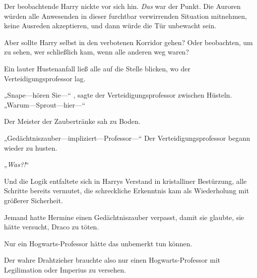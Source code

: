 Der beobachtende Harry nickte vor sich hin. \emph{Das} war der Punkt. Die Auroren würden alle Anwesenden in dieser furchtbar verwirrenden Situation mitnehmen, keine Ausreden akzeptieren, und dann würde die Tür unbewacht sein.

Aber sollte Harry selbst in den verbotenen Korridor gehen? Oder beobachten, um zu sehen, wer schließlich kam, wenn alle anderen weg waren?

Ein lauter Hustenanfall ließ alle auf die Stelle blicken, wo der Verteidigungsprofessor lag.

„Snape—hören Sie—“ , sagte der Verteidigungsprofessor zwischen Hüsteln. „Warum—Sprout—hier—“

Der Meister der Zaubertränke sah zu Boden.

„Gedächtniszauber—impliziert—Professor—“
Der Verteidigungsprofessor begann wieder zu husten.

„\emph{Was?!}“

Und die Logik entfaltete sich in Harrys Verstand in kristalliner Bestürzung, alle Schritte bereits vermutet, die schreckliche Erkenntnis kam als Wiederholung mit größerer Sicherheit.

Jemand hatte Hermine einen Gedächtniszauber verpasst, damit sie glaubte, sie hätte versucht, Draco zu töten.

Nur ein Hogwarts-Professor hätte das unbemerkt tun können.

Der wahre Drahtzieher brauchte also nur einen Hogwarts-Professor mit Legilimation oder Imperius zu versehen.

